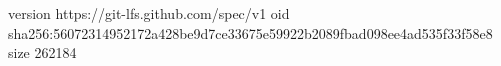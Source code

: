 version https://git-lfs.github.com/spec/v1
oid sha256:56072314952172a428be9d7ce33675e59922b2089fbad098ee4ad535f33f58e8
size 262184
